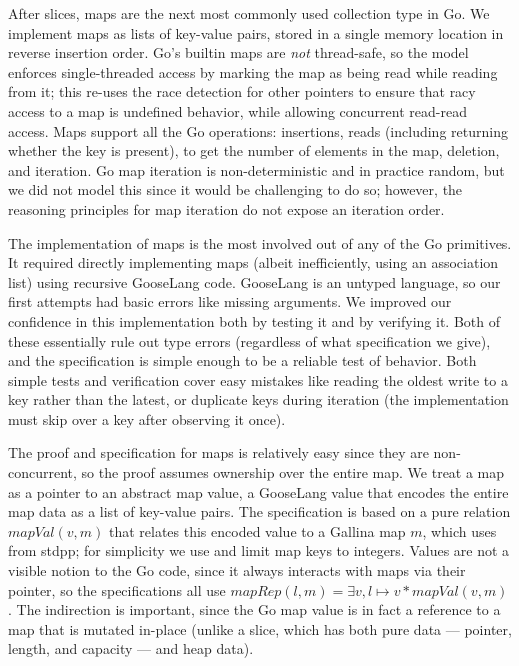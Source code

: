 After slices, maps are the next most commonly used collection type in
Go. We implement maps as lists of key-value pairs, stored in a single
memory location in reverse insertion order. Go's builtin maps are
\emph{not} thread-safe, so the model enforces single-threaded access by
marking the map as being read while reading from it; this re-uses the
race detection for other pointers to ensure that racy access to a map is
undefined behavior, while allowing concurrent read-read access. Maps
support all the Go operations: insertions, reads (including returning
whether the key is present),  to get the number of elements
in the map, deletion, and iteration. Go map iteration is
non-deterministic and in practice random, but we did not model this
since it would be challenging to do so; however, the reasoning
principles for map iteration do not expose an iteration order.

The implementation of maps is the most involved out of any of the Go
primitives. It required directly implementing maps (albeit
inefficiently, using an association list) using recursive GooseLang
code. GooseLang is an untyped language, so our first attempts had basic
errors like missing arguments. We improved our confidence in this
implementation both by testing it and by verifying it. Both of these
essentially rule out type errors (regardless of what specification we give),
and the specification is simple enough
to be a reliable test of behavior. Both simple tests and verification
cover easy mistakes like reading the oldest write to a key rather than
the latest, or duplicate keys during iteration (the implementation must
skip over a key after observing it once).

The proof and specification for maps is relatively easy since they are
non-concurrent, so the proof assumes ownership over the entire map. We
treat a map as a pointer to an abstract map value, a GooseLang value
that encodes the entire map data as a list of key-value pairs. The
specification is based on a pure relation $mapVal(v, m)$ that relates
this encoded value to a Gallina map $m$, which uses  from
stdpp; for simplicity we use  and limit map
keys to integers. Values are not a visible notion to the Go code, since
it always interacts with maps via their pointer, so the specifications
all use $mapRep(l, m) = \exists v, l \mapsto v * mapVal(v, m)$. The
indirection is important, since the Go map value
 is in fact a reference to a map that is
mutated in-place (unlike a slice, which has both pure data --- pointer,
length, and capacity --- and heap data).

